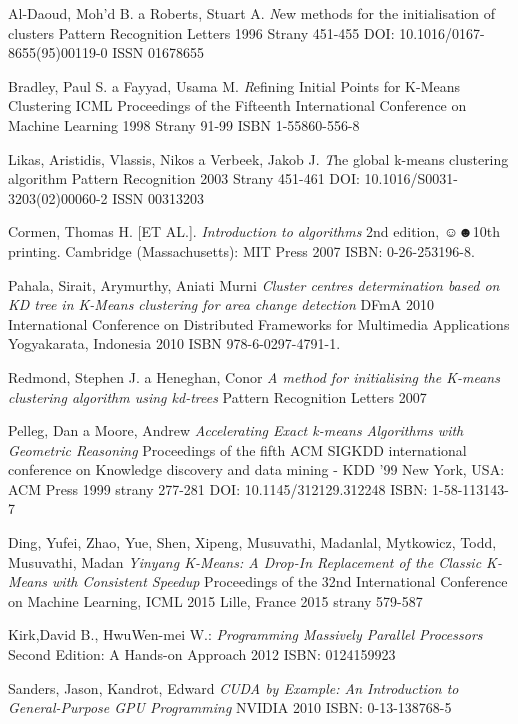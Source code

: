 \begin{thebibliography}{99}
{\sc Al-Daoud}, Moh'd B. a {\sc Roberts}, Stuart A.
{\emph New methods for the initialisation of clusters}
Pattern Recognition Letters
1996
Strany 451-455
DOI: 10.1016/0167-8655(95)00119-0
ISSN 01678655

{\sc Bradley}, Paul S. a {\sc Fayyad}, Usama M.
{\emph Refining Initial Points for K-Means Clustering}
ICML Proceedings of the Fifteenth International Conference on Machine Learning
1998
Strany 91-99
ISBN 1-55860-556-8

{\sc Likas}, Aristidis, {\sc Vlassis}, Nikos a {\sc Verbeek}, Jakob J.
{\emph The global k-means clustering algorithm}
Pattern Recognition
2003
Strany 451-461
DOI: 10.1016/S0031-3203(02)00060-2
ISSN 00313203

{\sc Cormen,} Thomas H. [ET AL.].
\emph{Introduction to algorithms}
2nd edition, ☺☻10th printing.
Cambridge (Massachusetts): MIT Press
2007 
ISBN: 0-26-253196-8.

{\sc Pahala,} Sirait, {\sc Arymurthy,} Aniati Murni
\emph{Cluster centres determination based on KD tree in K-Means clustering for area change detection}
DFmA 2010 International Conference on Distributed Frameworks for Multimedia Applications
Yogyakarata, Indonesia
2010 
ISBN 978-6-0297-4791-1.

{\sc Redmond}, Stephen J. a {\sc Heneghan}, Conor
\emph{A method for initialising the K-means clustering algorithm using kd-trees}
Pattern Recognition Letters
2007

{\sc Pelleg}, Dan a {\sc Moore}, Andrew
\emph{Accelerating Exact k-means Algorithms with Geometric Reasoning}
Proceedings of the fifth ACM SIGKDD international conference on Knowledge discovery and data mining - KDD '99 
New York, USA: ACM Press
1999
strany 277-281
DOI: 10.1145/312129.312248
ISBN: 1-58-113143-7

{\sc Ding}, Yufei, {\sc Zhao}, Yue, {\sc Shen}, Xipeng, {\sc Musuvathi}, Madanlal, {\sc Mytkowicz}, Todd, {\sc Musuvathi}, Madan
\emph{Yinyang K-Means: A Drop-In Replacement of the Classic K-Means with Consistent Speedup}
Proceedings of the 32nd International Conference on Machine Learning, ICML 2015
Lille, France
2015
strany 579-587

{\sc Kirk,}David B., {\sc Hwu}Wen-mei W.:
\emph{Programming Massively Parallel Processors}
Second Edition: A Hands-on Approach
2012
ISBN: 0124159923 

{\sc Sanders,} Jason, {\sc Kandrot,} Edward
\emph{CUDA by Example: An Introduction to General-Purpose GPU Programming}
NVIDIA
2010
ISBN: 0-13-138768-5 


\end{thebibliography}
